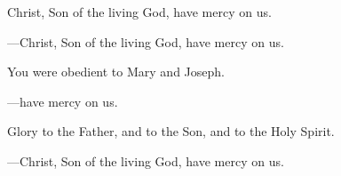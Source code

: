 \responsory

\begin{hangpar}
Christ, Son of the living God, have mercy on us.

{\color{red}---\thinspace }Christ, Son of the living God, have mercy on us.

\medskip You were obedient to Mary and Joseph.

{\color{red}---\thinspace }have mercy on us.

\medskip Glory to the Father, and to the Son, and to the Holy Spirit.

{\color{red}---\thinspace }Christ, Son of the living God, have mercy on us.
\end{hangpar}